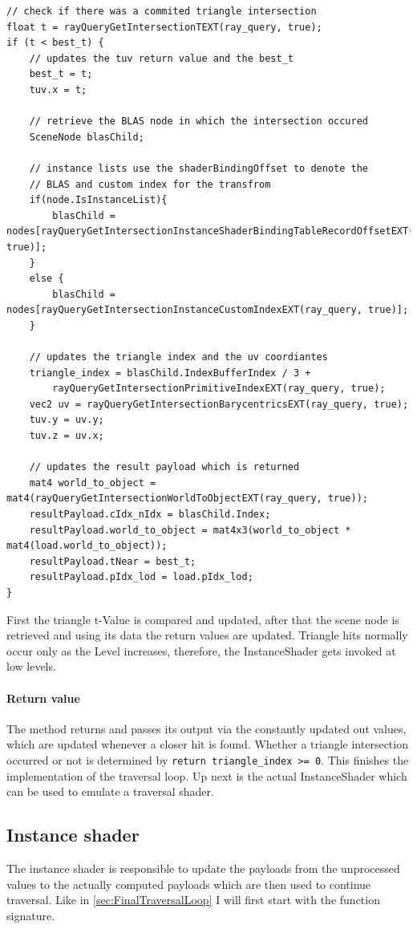 \begin{lstlisting}
// check if there was a commited triangle intersection
float t = rayQueryGetIntersectionTEXT(ray_query, true);
if (t < best_t) {
	// updates the tuv return value and the best_t
    best_t = t;
	tuv.x = t;
	
	// retrieve the BLAS node in which the intersection occured
	SceneNode blasChild;
		
	// instance lists use the shaderBindingOffset to denote the 
	// BLAS and custom index for the transfrom
	if(node.IsInstanceList){
		blasChild = nodes[rayQueryGetIntersectionInstanceShaderBindingTableRecordOffsetEXT(ray_query, true)];
	}
	else {
	    blasChild = nodes[rayQueryGetIntersectionInstanceCustomIndexEXT(ray_query, true)];
	}
		
	// updates the triangle index and the uv coordiantes
	triangle_index = blasChild.IndexBufferIndex / 3 +
		rayQueryGetIntersectionPrimitiveIndexEXT(ray_query, true);
	vec2 uv = rayQueryGetIntersectionBarycentricsEXT(ray_query, true);
	tuv.y = uv.y;
	tuv.z = uv.x;
			
	// updates the result payload which is returned
	mat4 world_to_object = mat4(rayQueryGetIntersectionWorldToObjectEXT(ray_query, true));
	resultPayload.cIdx_nIdx = blasChild.Index;
	resultPayload.world_to_object = mat4x3(world_to_object * mat4(load.world_to_object));
	resultPayload.tNear = best_t;
	resultPayload.pIdx_lod = load.pIdx_lod;
}
\end{lstlisting}

First the triangle t-Value is compared and updated, after that the scene node is retrieved and using its data the return values are updated. Triangle hits normally occur only as the Level increases, therefore, the InstanceShader gets invoked at low levels.
\newpage
\paragraph{Return value}
The method returns and passes its output via the constantly updated out values, which are updated whenever a closer hit is found. Whether a triangle intersection occurred or not is determined by \texttt{return triangle\_index >= 0}. This finishes the implementation of the traversal loop. Up next is the actual InstanceShader which can be used to emulate a traversal shader.

\subsection{Instance shader}
\label{sec:ImplInstanceShader}
The instance shader is responsible to update the payloads from the unprocessed values to the actually computed payloads which are then used to continue traversal. Like in \ref{sec:FinalTraversalLoop} I will first start with the function signature.
